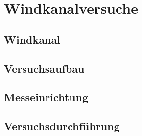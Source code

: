 \chapter{Windkanalversuche}\label{s:versuche}

\section{Windkanal}

\section{Versuchsaufbau}

\section{Messeinrichtung}

\section{Versuchsdurchf\"uhrung}


